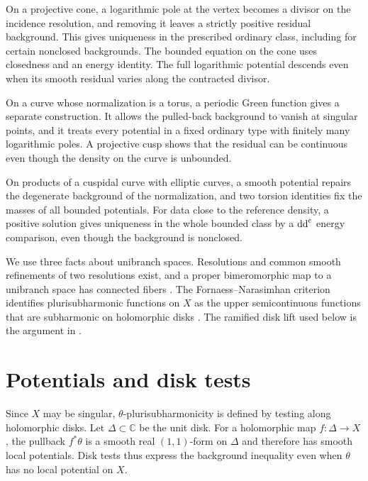 On a projective cone, a logarithmic pole at the vertex becomes a divisor on the incidence resolution, and removing it leaves a strictly positive residual background. This gives uniqueness in the prescribed ordinary class, including for certain nonclosed backgrounds. The bounded equation on the cone uses closedness and an energy identity. The full logarithmic potential descends even when its smooth residual varies along the contracted divisor.

On a curve whose normalization is a torus, a periodic Green function gives a separate construction. It allows the pulled-back background to vanish at singular points, and it treats every potential in a fixed ordinary type with finitely many logarithmic poles. A projective cusp shows that the residual can be continuous even though the density on the curve is unbounded.

On products of a cuspidal curve with elliptic curves, a smooth potential repairs the degenerate background of the normalization, and two torsion identities fix the masses of all bounded potentials. For data close to the reference density, a positive solution gives uniqueness in the whole bounded class by a $\mathrm{dd}^{\mathrm{c}}$ energy comparison, even though the background is nonclosed.

We use three facts about unibranch spaces. Resolutions and common smooth refinements of two resolutions exist, and a proper bimeromorphic map to a unibranch space has connected fibers \cite[Theorems B.1.1--B.1.3]{SGPT}. The Fornaess--Narasimhan criterion identifies plurisubharmonic functions on $X$ as the upper semicontinuous functions that are subharmonic on holomorphic disks \cite[Theorem B.2.1]{SGPT}. The ramified disk lift used below is the argument in \cite[proof of Theorem B.2.2]{SGPT}.

\section{Potentials and disk tests}

\label{sec:space-background-setting}
Since $X$ may be singular, $\theta$-plurisubharmonicity is defined by testing along holomorphic disks. Let $\Delta\subset\mathbb C$ be the unit disk. For a holomorphic map $f\colon \Delta\to X$, the pullback $f^*\theta$ is a smooth real $(1,1)$-form on $\Delta$ and therefore has smooth local potentials. Disk tests thus express the background inequality even when $\theta$ has no local potential on $X$.

